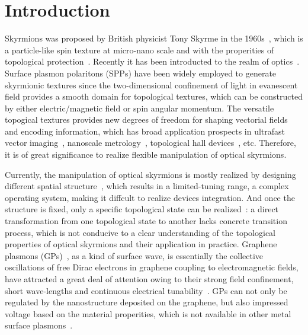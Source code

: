 \documentclass{optica-article}
\begin{document}
\section{Introduction}
Skyrmions was proposed by British physicist Tony Skyrme in the 1960s~\cite{skyrme1962unified1}, which is a particle-like spin texture at micro-nano scale and with the properities of topological protection~\cite{yu2010real2, nagaosa2013topological3}. Recently it has been introducted to the realm of optics~\cite{lei2021photonic42, lei2023metastability43, gutierrez2021optical45, gao2020paraxial46, lin2021microcavity47, RNshen48}. Surface plasmon polaritons (SPPs) have been widely employed to generate skyrmionic textures since the two-dimensional confinement of light in evanescent field provides a smooth domain for topological textures, which can be constructed by either electric/magnetic field or spin angular momentum. The versatile topogical textures provides new degrees of freedom for shaping vectorial fields and encoding information, which has broad application prospects in ultrafast vector imaging~\cite{lei2023metastability43}, nanoscale metrology~\cite{yang2023spin44}, topological hall devices~\cite{karnieli2021emulating24}, etc. Therefore, it is of great significance to realize flexible manipulation of optical skyrmions.

Currently, the manipulation of optical skyrmions is mostly realized by designing different spatial structure~\cite{deng2022observation5, ghosh2023spin6}, which results in a limited-tuning range, a complex operating system, making it diffcult to realize devices integration. And once the structure is fixed, only a specific topological state can be realized~\cite{dai2022ultrafast25, guo2020meron26, deng2022observation27}: a direct transformation from one topological state to another lacks concrete transition process, which is not conducive to a clear understanding of the topological properties of optical skyrmions and their application in practice.  Graphene plasmons (GPs)~\cite{jablan2009plasmonics28, minovkoppensich2011graphene9}, as a kind of surface wave, is essentially the collective oscillations of free Dirac electrons in graphene coupling to electromagnetic fields, have attracted a great deal of attention owing to their strong field confinement, short wave-lengths and continuous electrical tunability~\cite{wunsch2006dynamical7, fei2012gate8, chen2012optical10}. GPs can not only be regulated by the nanostructure deposited on the graphene, but also impressed voltage based on the material properities, which is not available in other metal surface plasmons~\cite{chan2008localized29, knight2012aluminum30, langhammer2008localized31}. 
\end{document}
